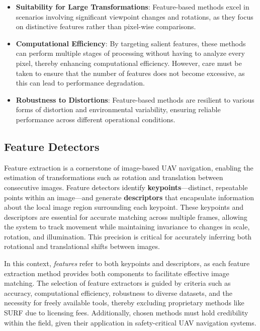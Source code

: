 \begin{itemize}
    \item \textbf{Suitability for Large Transformations}: Feature-based methods excel in scenarios involving significant viewpoint changes and rotations, as they focus on distinctive features rather than pixel-wise comparisons.
    \item \textbf{Computational Efficiency}: By targeting salient features, these methods can perform multiple stages of processing without having to analyze every pixel, thereby enhancing computational efficiency. However, care must be taken to ensure that the number of features does not become excessive, as this can lead to performance degradation.
    \item \textbf{Robustness to Distortions}: Feature-based methods are resilient to various forms of distortion and environmental variability, ensuring reliable performance across different operational conditions.
\end{itemize}




\subsection{Feature Detectors}

Feature extraction is a cornerstone of image-based UAV navigation, enabling the estimation of transformations such as rotation and translation between consecutive images. Feature detectors identify \textbf{keypoints}—distinct, repeatable points within an image—and generate \textbf{descriptors} that encapsulate information about the local image region surrounding each keypoint. These keypoints and descriptors are essential for accurate matching across multiple frames, allowing the system to track movement while maintaining invariance to changes in scale, rotation, and illumination. This precision is critical for accurately inferring both rotational and translational shifts between images.

In this context, \textit{features} refer to both keypoints and descriptors, as each feature extraction method provides both components to facilitate effective image matching. The selection of feature extractors is guided by criteria such as accuracy, computational efficiency, robustness to diverse datasets, and the necessity for freely available tools, thereby excluding proprietary methods like SURF due to licensing fees. Additionally, chosen methods must hold credibility within the field, given their application in safety-critical UAV navigation systems.

